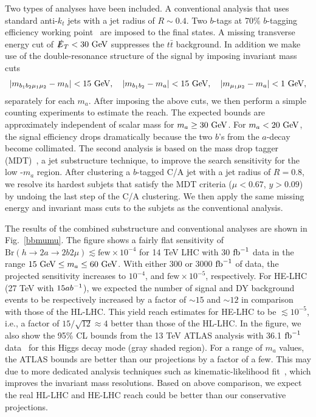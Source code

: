 Two types of analyses have been included. A conventional analysis that uses standard anti-$k_t$ jets with a jet radius of $R\sim 0.4$. Two $b$-tags at 70\% $b$-tagging efficiency working point~\cite{ATLAS:2014cal}  are imposed to the final states. A missing transverse energy cut of $\slashed{E}_T < 30 ~\text{GeV}$ suppresses the $t \bar t$ background. In addition we make use of the double-resonance structure of the signal by imposing invariant mass cuts 
\begin{align}
|m_{b_1 b_2 \mu_1 \mu_2}-m_h|< 15~\text{GeV},\quad |m_{b_1 b_2}-m_a|< 15~\text{GeV},\quad|m_{\mu_1\mu_2}-m_a| < 1~\text{GeV},
\end{align}
separately for each $m_a$. After imposing the above cuts, we then perform a simple counting experiments to estimate the reach. The expected bounds are approximately independent of scalar mass for $m_a \geq 30 ~\text{GeV}$. For $m_a < 20 ~\text{GeV}$, the signal efficiency drops dramatically because the two $b$'s from the $a$-decay become collimated. The second analysis is based on the mass drop tagger (MDT)~\cite{Butterworth:2008sd}, a jet substructure technique, to improve the search sensitivity for the low -$m_a$ region. After clustering a $b$-tagged C/A  jet with a jet radius of $R=0.8$, we resolve its hardest subjets that satisfy the MDT criteria ($\mu < 0.67$, $y>0.09$) by undoing the last step of the C/A clustering. We then apply the same missing energy and invariant mass cuts to the subjets as the conventional analysis.

The results of the combined substructure and conventional analyses are shown in Fig.~\ref{bbmumu}. The figure shows a fairly flat sensitivity of  $\mathrm{Br}(h \to 2a \to 2b2\mu) \lesssim \text{few}\times10^{-4}$ for 14 TeV LHC with 30 ${\rm fb}^{-1}$ data in the range $15~\text{GeV} \leq m_a \leq 60 ~\text{GeV}$. With either 300 or 3000 ${\rm fb}^{-1}$ of data, the projected sensitivity increases to  $10^{-4}$, and $\text{few}\times 10^{-5}$, respectively. For HE-LHC (27 TeV with $15ab^{-1}$), we expected the number of signal and DY background events to be respectively increased by a factor of $\sim15$ and $\sim12$ in comparison with those of the HL-LHC. This yield reach estimates for HE-LHC to be 
$\lesssim 10^{-5}$, i.e., a factor of $15/\sqrt{12}\approx 4$ better than those of the HL-LHC. In the figure, we also show the 95\% CL bounds from the 13 TeV ATLAS analysis with 36.1 ${\rm fb}^{-1}$ data~\cite{Aaboud:2018esj} for this Higgs decay mode (gray shaded region). For a range of $m_a$ values, the ATLAS bounds are better than our projections  by a factor of a few. This may due to more dedicated analysis techniques such as kinematic-likelihood fit~\cite{Aaboud:2018esj}, which improves the invariant mass resolutions. Based on above comparison, we expect the real HL-LHC and HE-LHC reach could be better than our conservative projections. 



